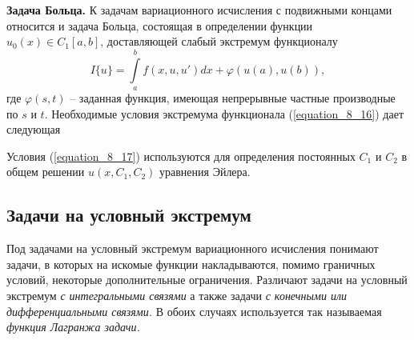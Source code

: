 	{\bf Задача Больца.} К задачам вариационного исчисления с подвижными концами относится и задача Больца, состоящая в определении функции $u_0(x)\in C_1[a, b]$, доставляющей слабый экстремум функционалу
	\begin{equation}
	\label{equation_8_16}
		\textstyle I\{u \} = \int\limits^b_a f(x,u,u')dx + \varphi(u(a),u(b)),
	\end{equation}
	где $\varphi (s,t)$ – заданная функция, имеющая непрерывные частные производные по $s$ и $t$. Необходимые условия экстремума функционала (\ref{equation_8_16}) дает следующая

	Условия (\ref{equation_8_17}) используются для определения постоянных $C_1$ и $C_2$ в общем решении $u(x, C_1, C_2)$ уравнения Эйлера.

	\newpage

	\subsection{Задачи на условный экстремум}

	\vspace*{-\baselineskip}
	\vspace*{1mm}
	Под задачами на условный экстремум вариационного исчисления понимают задачи, в которых на искомые функции накладываются, помимо граничных условий, некоторые дополнительные ограничения. Различают задачи на условный экстремум {\it с интегральными связями} а также задачи {\it с конечными или дифференциальными связями.} В обоих случаях используется так называемая {\it функция Лагранжа задачи.}

